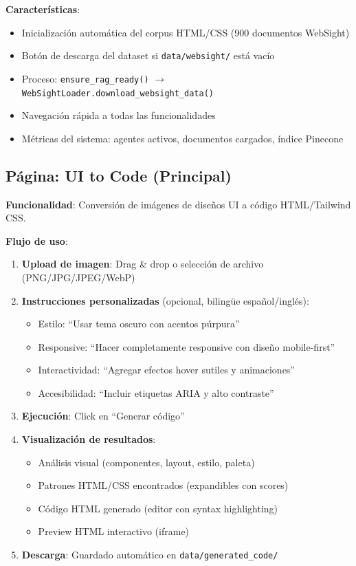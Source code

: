 \documentclass[12pt,a4paper]{article}
\begin{document}
\textbf{Características}:
\begin{itemize}
    \item Inicialización automática del corpus HTML/CSS (900 documentos WebSight)
    \item Botón de descarga del dataset si \texttt{data/websight/} está vacío
    \item Proceso: \texttt{ensure\_rag\_ready()} $\rightarrow$ \texttt{WebSightLoader.download\_websight\_data()}
    \item Navegación rápida a todas las funcionalidades
    \item Métricas del sistema: agentes activos, documentos cargados, índice Pinecone
\end{itemize}

\subsection{Página: UI to Code (Principal)}

\textbf{Funcionalidad}: Conversión de imágenes de diseños UI a código HTML/Tailwind CSS.

\textbf{Flujo de uso}:
\begin{enumerate}
    \item \textbf{Upload de imagen}: Drag \& drop o selección de archivo (PNG/JPG/JPEG/WebP)
    \item \textbf{Instrucciones personalizadas} (opcional, bilingüe español/inglés):
    \begin{itemize}
        \item Estilo: ``Usar tema oscuro con acentos púrpura''
        \item Responsive: ``Hacer completamente responsive con diseño mobile-first''
        \item Interactividad: ``Agregar efectos hover sutiles y animaciones''
        \item Accesibilidad: ``Incluir etiquetas ARIA y alto contraste''
    \end{itemize}
    \item \textbf{Ejecución}: Click en ``Generar código''
    \item \textbf{Visualización de resultados}:
    \begin{itemize}
        \item Análisis visual (componentes, layout, estilo, paleta)
        \item Patrones HTML/CSS encontrados (expandibles con scores)
        \item Código HTML generado (editor con syntax highlighting)
        \item Preview HTML interactivo (iframe)
    \end{itemize}
    \item \textbf{Descarga}: Guardado automático en \texttt{data/generated\_code/}
\end{enumerate}
\end{document}
